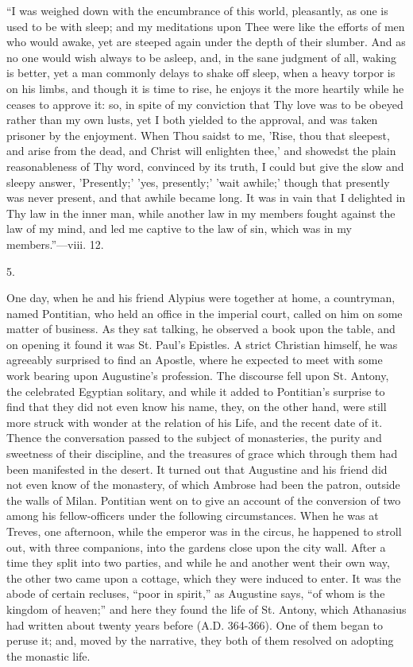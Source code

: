 ``I was weighed down with the encumbrance of this world,
pleasantly, as one is used to be with sleep; and my meditations upon
Thee were like the efforts of men who would awake, yet are steeped
again under the depth of their slumber. And as no one would wish
always to be asleep, and, in the sane judgment of all, waking is
better, yet a man commonly delays to shake off sleep, when a heavy
torpor is on his limbs, and though it is time to rise, he enjoys it
the more heartily while he ceases to approve it: so, in spite of my
conviction that Thy love was to be obeyed rather than my own lusts,
yet I both yielded to the approval, and was taken prisoner by the
enjoyment. When Thou saidst to me, 'Rise, thou that sleepest, and
arise from the dead, and Christ will enlighten thee,' and showedst the
plain reasonableness of Thy word, convinced by its truth, I could but
give the slow and sleepy answer, 'Presently;' 'yes, presently;' 'wait
awhile;' though that presently was never present, and that awhile
became long. It was in vain that I delighted in Thy law in the inner
man, while another law in my members fought against the law of my
mind, and led me captive to the law of sin, which was in my
members.''—viii. 12.

5.

One day, when he and his friend Alypius were together at home, a
countryman, named Pontitian, who held an office in the imperial court,
called on him on some matter of business. As they sat talking, he
observed a book upon the table, and on opening it found it was St.
Paul's Epistles. A strict Christian himself, he was agreeably
surprised to find an Apostle, where he expected to meet with some work
bearing upon Augustine's profession. The discourse fell upon St.
Antony, the celebrated Egyptian solitary, and while it added to
Pontitian's surprise to find that they did not even know his name,
they, on the other hand, were still more struck with wonder at the
relation of his Life, and the recent date of it. Thence the
conversation passed to the subject of monasteries, the purity and
sweetness of their discipline, and the treasures of grace which
through them had been manifested in the desert. It turned out that
Augustine and his friend did not even know of the monastery, of which
Ambrose had been the patron, outside the walls of Milan. Pontitian
went on to give an account of the conversion of two among his
fellow-officers under the following circumstances. When he was at
Treves, one afternoon, while the emperor was in the circus, he
happened to stroll out, with three companions, into the gardens close
upon the city wall. After a time they split into two parties, and
while he and another went their own way, the other two came upon a
cottage, which they were induced to enter. It was the abode of certain
recluses, ``poor in spirit,'' as Augustine says, ``of whom
is the kingdom of heaven;'' and here they found the life of St.
Antony, which Athanasius had written about twenty years before (A.D.
364-366). One of them began to peruse it; and, moved by the
narrative, they both of them resolved on adopting the monastic life.

